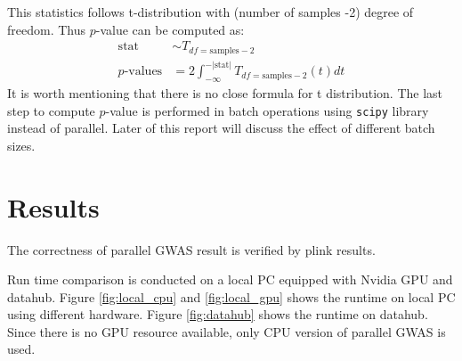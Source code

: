 \documentclass{article}
\begin{document}
This statistics follows t-distribution with (number of samples -2) degree of freedom.
Thus $p$-value can be computed as:
$$
\begin{aligned}\text{stat} &\sim T_{df=\text{samples} -2}\\ p\text{-values} &=2\int^{-|\text{stat} |}_{-\infty } T_{df=\text{samples} -2}(t)dt\end{aligned}
$$
It is worth mentioning that there is no close formula for t distribution.
The last step to compute $p$-value is performed in batch operations 
using \texttt{scipy} library instead of parallel. 
Later of this report will discuss the effect of different batch sizes.

\section{Results}
The correctness of parallel GWAS result is verified by plink results.

Run time comparison is conducted on a local PC equipped with Nvidia GPU and datahub.
Figure \ref*{fig:local_cpu} and \ref*{fig:local_gpu} shows the runtime 
on local PC using different hardware.
Figure \ref*{fig:datahub} shows the runtime on datahub. 
Since there is no GPU resource available, only CPU version of parallel GWAS is used.
\end{document}
